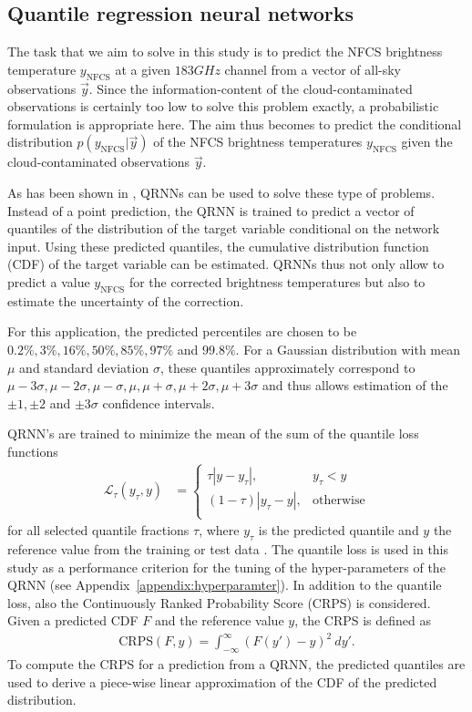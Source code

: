 \documentclass[amt, manuscript]{copernicus}
\newcommand{\todo}[1]{{\color{red} #1}}
\newcommand{\ynfcs}{y_\text{NFCS}}
\newcommand{\y}{\vec{y}}
\begin{document}
\subsection{Quantile regression neural networks}
\label{sec:QRNN}
%
The task that we aim to solve in this study is to predict the NFCS brightness
temperature \todo{$\ynfcs$} at a given $183\unit{GHz}$ channel from a vector of
all-sky observations $\y$. Since the information-content of the
cloud-contaminated observations is certainly too low to solve this problem
exactly, a probabilistic formulation is appropriate here. The aim thus becomes
to predict the conditional distribution $p(\ynfcs | \y)$ of the NFCS brightness
temperatures $\ynfcs$ given the cloud-contaminated observations $\y$.

As has been shown in \citet{pfreundschuh:aneur:18}, QRNNs can be used to solve
these type of problems. Instead of a point prediction, the QRNN is trained to
predict a vector of quantiles of the distribution of the target variable
conditional on the network input. Using these predicted quantiles, the cumulative
distribution function (CDF) of the target variable can be estimated. QRNNs thus
not only allow to predict a value $\ynfcs$ for the corrected brightness temperatures
but also to estimate the uncertainty of the correction.

For this application, the predicted percentiles are chosen to be
$0.2\%, 3\%, 16\%, 50\%, 85\%, 97\%$ and $99.8\%$. For a Gaussian
distribution with mean $\mu$ and standard deviation $\sigma$, these quantiles
approximately correspond to $\mu -3\sigma, \mu-2\sigma, \mu-\sigma
, \mu, \mu + \sigma, \mu + 2\sigma, \mu + 3\sigma$ and thus allows
estimation of the $\pm 1, \pm 2$ and $\pm 3\sigma$ confidence intervals.

QRNN's are trained to minimize the mean of the sum of the quantile loss functions
%
\begin{align}
\mathcal{L}_\tau(y_\tau, y) &=
\begin{cases}
\tau|y - y_\tau|, & y_\tau < y \\ (1 - \tau)|y_\tau - y|, & \text{otherwise}
\\
\end{cases}
\end{align}
%
for all selected quantile fractions $\tau$, where $y_\tau$ is the predicted
quantile and $y$ the reference value from the training or test data . The
quantile loss is used in this study as a performance criterion for the tuning of
the hyper-parameters of the QRNN (see Appendix~\ref{appendix:hyperparamter}). In
addition to the quantile loss, also the Continuously Ranked Probability Score
(CRPS) is considered. Given a predicted CDF
$F$ and the reference value $y$, the CRPS is defined as
%
\begin{align}
\text{CRPS}(F, y) = \int_{-\infty}^{\infty} \left (F(y') - y\right )^2\: dy'.
\end{align}
%
To compute the CRPS for a prediction from a QRNN, the predicted quantiles are
used to derive a piece-wise linear approximation of the CDF of the predicted
distribution.
\end{document}
